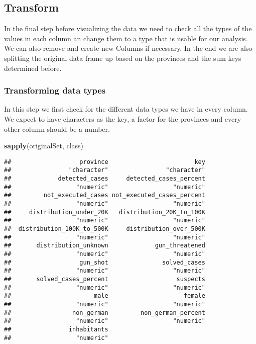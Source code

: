 \documentclass[
]{article}
\newenvironment{Shaded}{\begin{snugshade}}{\end{snugshade}}
\newcommand{\KeywordTok}[1]{\textcolor[rgb]{0.13,0.29,0.53}{\textbf{#1}}}
\newcommand{\NormalTok}[1]{#1}
\newcommand{\OperatorTok}[1]{\textcolor[rgb]{0.81,0.36,0.00}{\textbf{#1}}}
\newcommand{\StringTok}[1]{\textcolor[rgb]{0.31,0.60,0.02}{#1}}
\begin{document}
\begin{Shaded}
\end{Shaded}

\hypertarget{transform}{%
\subsection{Transform}\label{transform}}

In the final step before visualizing the data we need to check all the
types of the values in each column an change them to a type that is
usable for our analysis. We can also remove and create new Columns if
necessary. In the end we are also splitting the original data frame up
based on the provinces and the sum keys determined before.

\hypertarget{transforming-data-types}{%
\subsubsection{Transforming data types}\label{transforming-data-types}}

In this step we first check for the different data types we have in
every column. We expect to have characters as the key, a factor for the
provinces and every other column should be a number.

\begin{Shaded}
\begin{Highlighting}[]
\KeywordTok{sapply}\NormalTok{(originalSet, class)}
\end{Highlighting}
\end{Shaded}

\begin{verbatim}
##                   province                        key 
##                "character"                "character" 
##             detected_cases     detected_cases_percent 
##                  "numeric"                  "numeric" 
##         not_executed_cases not_executed_cases_percent 
##                  "numeric"                  "numeric" 
##     distribution_under_20K   distribution_20K_to_100K 
##                  "numeric"                  "numeric" 
##  distribution_100K_to_500K     distribution_over_500K 
##                  "numeric"                  "numeric" 
##       distribution_unknown             gun_threatened 
##                  "numeric"                  "numeric" 
##                   gun_shot               solved_cases 
##                  "numeric"                  "numeric" 
##       solved_cases_percent                   suspects 
##                  "numeric"                  "numeric" 
##                       male                     female 
##                  "numeric"                  "numeric" 
##                 non_german         non_german_percent 
##                  "numeric"                  "numeric" 
##                inhabitants 
##                  "numeric"
\end{verbatim}
\end{document}

